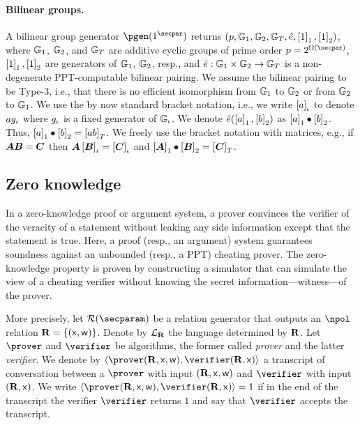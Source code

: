 \documentclass[runningheads,11pt]{llncs}
\let\spvec\vec
\let\vec\accentvec
\let\vec\spvec
\def\vec#1{\mathchoice{\mbox{\boldmath$\displaystyle#1$}}
	{\mbox{\boldmath$\textstyle#1$}}
	{\mbox{\boldmath$\scriptstyle#1$}}
	{\mbox{\boldmath$\scriptscriptstyle#1$}}}
\theoremstyle{definition}
\begin{document}
\paragraph{Bilinear groups.}
A bilinear group generator $\pgen (1^\secpar)$ returns $(p, \mathbb{G}_1, \mathbb{G}_2, \mathbb{G}_T, \hat{e}, \left[1\right]_{1}, \left[1\right]_{2})$, where $\mathbb{G}_1$, $\mathbb{G}_2$, and $\mathbb{G}_T$ are additive cyclic groups of prime order $p = 2^{\Omega (\secpar)}$, $\left[1\right]_{1}, \left[1\right]_{2}$ are generators of $\mathbb{G}_1$, $\mathbb{G}_2$, resp., and $\hat{e}: \mathbb{G}_1 \times \mathbb{G}_2 \to \mathbb{G}_T$ is a non-degenerate PPT-computable bilinear pairing.
We assume the bilinear pairing to be Type-3, i.e., that there is no efficient isomorphism from $\mathbb{G}_1$ to $\mathbb{G}_2$ or from $\mathbb{G}_2$ to $\mathbb{G}_1$.
We use the by now standard bracket notation, i.e., we write $\left[a\right]_{\iota}$ to denote $a g_{\iota}$ where $g_{\iota}$ is a fixed generator of $\mathbb{G}_{\iota}$.
We denote $\hat{e} (\left[a\right]_{1}, \left[b\right]_{2})$ as $\left[a\right]_{1} \bullet \left[b\right]_{2}$.
Thus, $\left[a\right]_{1} \bullet \left[b\right]_{2} = \left[a b\right]_{T}$.
We freely use the bracket notation with matrices, e.g., if $\vec{A} \vec{B} = \vec{C}$ then $\vec{A} \grpgi{\vec{B}} = \grpgi{\vec{C}}$ and $\gone{\vec{A}}\bullet \gtwo{\vec{B}} = \gtar{\vec{C}}$.

\subsection{Zero knowledge}
In a zero-knowledge proof or argument system, a prover convinces the verifier of the veracity of a statement without leaking any side information except that the statement is true.
Here, a proof (resp., an argument) system guarantees soundness against an unbounded (resp., a PPT) cheating prover.
The zero-knowledge property is proven by constructing a simulator that can simulate the view of a cheating verifier without knowing the secret information---witness---of the prover.

More precisely, let $\RELGEN(\secparam)$ be a relation generator that outputs an $\npol$ relation $\mathbf{R} = \{(\mathsf{x}, \mathsf{w})\}$. Denote by $\mathcal{L}_{\mathbf{R}}$ the language determined by $\mathbf{R}$.
Let $\prover$ and $\verifier$ be algorithms, the former called \emph{prover} and the latter \emph{verifier}.
We denote by $\ip{\prover(\REL, \inp, \wit)}{\verifier(\REL, \inp)}$ a transcript of conversation between a $\prover$ with input $(\mathbf{R}, \mathsf{x}, \mathsf{w})$ and $\verifier$ with input $(\mathbf{R}, \mathsf{x})$.
We write $\ip{\prover (\REL, \inp, \wit)}{\verifier(\REL, \inp)} = 1$ if in the end of the transcript the verifier $\verifier$ returns $1$ and say that $\verifier$ accepts the transcript.
\end{document}

